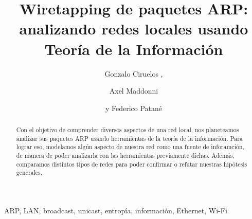 \documentclass[%
	final, %
	notitlepage,
	narroweqnarray,
	inline,
	twoside,
	]{ieee}
\begin{document}
\title[Wiretapping de paquetes ARP]{%
	Wiretapping de paquetes ARP: analizando redes locales usando Teor\'ia de la Informaci\'on
}

\author[CIRUELOS, MADDONI, PATAN\'E]{
Gonzalo Ciruelos ,
\and{}Axel Maddonni%
\and{}y Federico Patan\'e
}



\maketitle               


\begin{abstract} 
Con el objetivo de comprender diversos aspectos de una red local, nos planeteamos analizar sus paquetes ARP usando herramientas de la teor\'ia de la informaci\'on.
Para lograr eso, modelamos alg\'un aspecto de nuestra red como una fuente de inforamci\'on, de manera de poder analizarla con las herramientas previamente dichas.
Adem\'as, comparamos distintos tipos de redes para poder confirmar o refutar nuestras hip\'otesis generales.
\end{abstract}

\begin{keywords}
ARP, LAN, broadcast, unicast, entrop\'ia, informaci\'on, Ethernet, Wi-Fi
\end{keywords}














\end{document}
